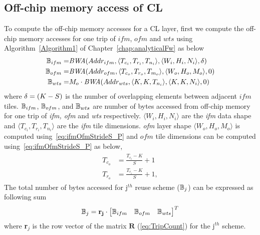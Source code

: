 \subsection{Off-chip memory access of CL}\label{sec:AccessCLData}
To compute the off-chip memory accesses for a CL layer, first we compute the off-chip memory accesses for one trip of $ifm$, $ofm$ and $wts$ using Algorithm~\ref{Algorithm1} of Chapter~\ref{chap:analyticalFw} as below
\begin{align*}
	\begin{split}
		\mathbb{B}_{ifm}=&\emph{BWA}(Addr_{ifm},\langle T_{c_i}, T_{r_i},T_{n_i}\rangle,\langle W_i,H_i,N_i\rangle,\delta)\\
		\mathbb{B}_{ofm}=&\emph{BWA}(Addr_{ofm},\langle T_{c_o},T_{r_o},T_{m_o}\rangle,\langle W_o,H_o,M_o\rangle,0)\\
		\mathbb{B}_{wts}=&M_o\cdot \emph{BWA}(Addr_{wts},\langle K,K,T_{n_i}\rangle,\langle K,K,N_i\rangle,0)
	\end{split}
\end{align*} 
where $\delta=(K-S)$ is the number of overlapping elements between adjacent $ifm$ tiles. $\mathbb{B}_{ifm}$, $\mathbb{B}_{ofm}$, and $\mathbb{B}_{wts}$ are number of bytes accessed from off-chip memory for one trip of \textit{ifm, ofm} and \textit{wts} respectively. $\langle W_{i},H_{i},N_{i}\rangle$ are the \textit{ifm} data shape and $\langle T_{c_i},T_{r_i},T_{n_i}\rangle$ are the \textit{ifm} tile dimensions. \textit{ofm} layer shape $\langle W_{o},H_{o},M_{o}\rangle$ is computed using~\eqref{eq:ifmOfmStrideS_P} and $ofm$ tile dimensions can be computed using~\eqref{eq:ifmOfmStrideS_P} as below,
\begin{align}\label{eq:ofmAndifmTileDims}
	\begin{split}
		T_{c_o}&=\frac{T_{c_{i}}-K}{S}+1 \\
		T_{r_o}&=\frac{T_{r_{i}}-K}{S}+1,
	\end{split}
\end{align}  
The total number of bytes accessed for j$^{th}$ reuse scheme ($\mathbb{B}_j$) can be expressed as following sum
\begin{equation} \label{eq:TotalOffChipAccess}
	\mathbb{B}_j=\mathbf{r_j}\cdot \begin{bmatrix}
		\mathbb{B}_{ifm} &
		\mathbb{B}_{ofm} &
		\mathbb{B}_{wts}
	\end{bmatrix}^{T}
\end{equation}
where \textbf{r}$_j$ is the row vector of the matrix $\mathbf{R}$ (\eqref{eq:TripCount}) for the j$^{th}$ scheme. 
